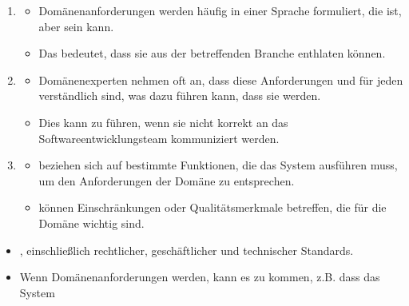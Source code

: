 \begin{infoBox}[title=Merkmale von Domänenanforderungen:]
    \begin{enumerate}
        \item {}
        \begin{itemize}
            \item Domänenanforderungen werden häufig in einer Sprache formuliert, die  ist, aber  sein kann.
            \item Das bedeutet, dass sie  aus der betreffenden Branche enthlaten können.
        \end{itemize}
        \item {}
        \begin{itemize}
            \item Domänenexperten nehmen oft an, dass diese Anforderungen  und für jeden verständlich sind, was dazu führen kann, dass sie  werden.
            \item Dies kann zu  führen, wenn sie nicht korrekt an das Softwareentwicklungsteam kommuniziert werden.
        \end{itemize}
        \item {}
        \begin{itemize}
            \item {} beziehen sich auf bestimmte Funktionen, die das System ausführen muss, um den Anforderungen der Domäne zu entsprechen.
            \item {} können Einschränkungen oder Qualitätsmerkmale betreffen, die für die Domäne wichtig sind.
        \end{itemize}
    \end{enumerate}
\end{infoBox}
\begin{infoBox}[title=Warum sind Domänenanforderungen wichtig?]
    \begin{itemize}
        \item {}, einschließlich rechtlicher, geschäftlicher und technischer Standards.
        \item Wenn Domänenanforderungen  werden, kann es zu  kommen, z.B. dass das System 
    \end{itemize}
\end{infoBox}


